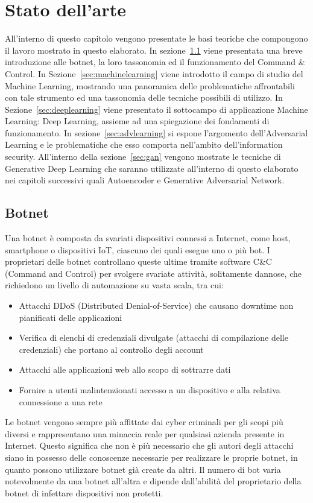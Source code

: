 \chapter{Stato dell'arte}
\label{statodellarte}
All'interno di questo capitolo vengono presentate le basi teoriche che compongono il lavoro mostrato in questo elaborato. In sezione~\ref{sec:botnet} viene presentata una breve introduzione alle botnet, la loro tassonomia ed il funzionamento del Command \& Control. In Sezione~\ref{sec:machinelearning} viene introdotto il campo di studio del Machine Learning, mostrando una panoramica delle problematiche affrontabili con tale strumento ed una tassonomia delle tecniche possibili di utilizzo. In Sezione~\ref{sec:deeplearning} viene presentato il sottocampo di applicazione Machine Learning: Deep Learning, assieme ad una spiegazione dei fondamenti di funzionamento. In sezione~\ref{sec:advlearning} si espone l'argomento dell'Adversarial Learning e le problematiche che esso comporta nell'ambito dell'information security. All'interno della sezione~\ref{sec:gan} vengono mostrate le tecniche di Generative Deep Learning che saranno utilizzate all'interno di questo elaborato nei capitoli successivi quali Autoencoder e Generative Adversarial Network.

\newpage
\section{Botnet}
\label{sec:botnet}
Una botnet è composta da svariati dispositivi connessi a Internet, come host, smartphone o dispositivi IoT, ciascuno dei quali esegue uno o più bot. I proprietari delle botnet controllano queste ultime tramite software C\&C (Command and Control) per svolgere svariate attività, solitamente dannose, che richiedono un livello di automazione su vasta scala, tra cui:
\begin{itemize}
\item Attacchi DDoS (Distributed Denial-of-Service) che causano downtime non pianificati delle applicazioni
\item Verifica di elenchi di credenziali divulgate (attacchi di compilazione delle credenziali) che portano al controllo degli account
\item Attacchi alle applicazioni web allo scopo di sottrarre dati
\item Fornire a utenti malintenzionati accesso a un dispositivo e alla relativa connessione a una rete
\end{itemize}

Le botnet vengono sempre più affittate dai cyber criminali per gli scopi più diversi e rappresentano una minaccia reale per qualsiasi azienda presente in Internet. Questo significa che non è più necessario che gli autori degli attacchi siano in possesso delle conoscenze necessarie per realizzare le proprie botnet, in quanto possono utilizzare botnet già create da altri. Il numero di bot varia notevolmente da una botnet all'altra e dipende dall'abilità del proprietario della botnet di infettare dispositivi non protetti. 

